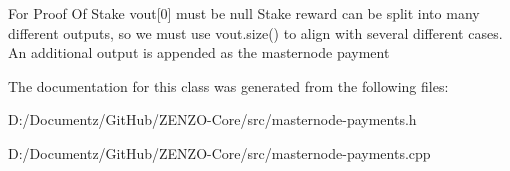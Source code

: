 For Proof Of Stake vout\mbox{[}0\mbox{]} must be null Stake reward can be split into many different outputs, so we must use vout.\+size() to align with several different cases. An additional output is appended as the masternode payment

The documentation for this class was generated from the following files\+:\begin{DoxyCompactItemize}
\item 
D\+:/\+Documentz/\+Git\+Hub/\+Z\+E\+N\+Z\+O-\/\+Core/src/masternode-\/payments.\+h\item 
D\+:/\+Documentz/\+Git\+Hub/\+Z\+E\+N\+Z\+O-\/\+Core/src/masternode-\/payments.\+cpp\end{DoxyCompactItemize}
